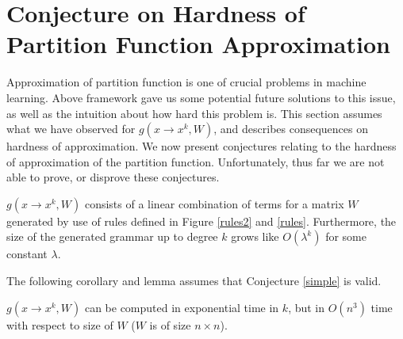 \section{Conjecture on Hardness of Partition Function Approximation}
Approximation of partition function is one of crucial problems in machine learning.
Above framework gave us some potential future solutions to this issue, as 
well as the intuition about how hard this problem is. This section assumes what we have
observed for $g(x \rightarrow x^k, W)$, and describes consequences on hardness of approximation.
We now present conjectures relating to the hardness of approximation
of the partition function. Unfortunately, thus far we are not able to prove, or disprove these conjectures.
\begin{conjecture}
  $g(x \rightarrow x^k, W)$ consists of a linear combination of terms
  for a matrix $W$ generated by use of rules defined in Figure
  \ref{rules2} and \ref{rules}.  Furthermore, the size of the generated grammar up to degree $k$
  grows like $O(\lambda^k)$ for some constant $\lambda$.
\label{simple}
\end{conjecture}

The following corollary and lemma assumes that Conjecture \ref{simple} is valid.

\begin{corollary}
	$g(x \rightarrow x^k, W)$
	can be computed in exponential time in $k$, but in $O(n^3)$ time with respect to size of $W$ ($W$ is of size $n \times n$).
\end{corollary}

